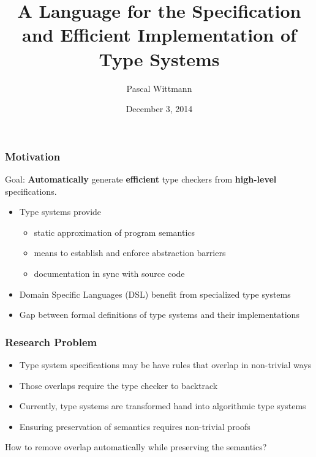 \documentclass{beamer}
\title{A Language for the Specification and Efficient Implementation
  of Type Systems}
\author{Pascal Wittmann}
\date{December 3, 2014}
\begin{document}
\begin{frame}[plain]
  \titlepage{}
\end{frame}

\begin{frame}
  \frametitle{Motivation}

  \begin{center}
    Goal: \textbf{Automatically} generate \textbf{efficient} type
    checkers from \textbf{high-level} specifications.
  \end{center}

  \begin{itemize}
  \item Type systems provide
    \begin{itemize}
    \item static approximation of program semantics
    \item means to establish and enforce abstraction barriers
    \item documentation in sync with source code
    \end{itemize}
  \item Domain Specific Languages (DSL) benefit from specialized type systems
  \item Gap between formal definitions of type systems and their
    implementations
  \end{itemize}
\end{frame}

\begin{frame}
  \frametitle{Research Problem}
  \begin{itemize}
  \item Type system specifications may be have rules that overlap in
    non-trivial ways
  \item Those overlaps require the type checker to backtrack
  \item Currently, type systems are transformed hand into algorithmic
    type systems
  \item Ensuring preservation of semantics requires non-trivial proofs
  \end{itemize}
  \begin{centering}
    How to remove overlap automatically while preserving the semantics?
  \end{centering}
\end{frame}
\end{document}
